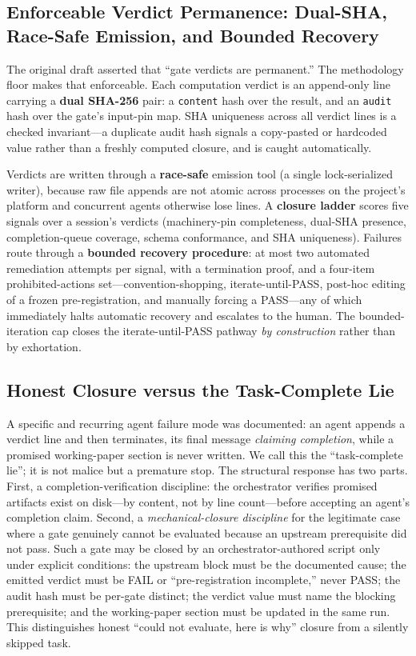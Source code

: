 \documentclass[12pt,a4paper]{article}
\begin{document}
\subsection{Enforceable Verdict Permanence: Dual-SHA, Race-Safe Emission, and Bounded Recovery}
\label{sec:floor-verdict}

The original draft asserted that ``gate verdicts are permanent.'' The methodology floor makes that enforceable. Each computation verdict is an append-only line carrying a \textbf{dual SHA-256} pair: a \texttt{content} hash over the result, and an \texttt{audit} hash over the gate's input-pin map. SHA uniqueness across all verdict lines is a checked invariant---a duplicate audit hash signals a copy-pasted or hardcoded value rather than a freshly computed closure, and is caught automatically.

Verdicts are written through a \textbf{race-safe} emission tool (a single lock-serialized writer), because raw file appends are not atomic across processes on the project's platform and concurrent agents otherwise lose lines. A \textbf{closure ladder} scores five signals over a session's verdicts (machinery-pin completeness, dual-SHA presence, completion-queue coverage, schema conformance, and SHA uniqueness). Failures route through a \textbf{bounded recovery procedure}: at most two automated remediation attempts per signal, with a termination proof, and a four-item prohibited-actions set---convention-shopping, iterate-until-PASS, post-hoc editing of a frozen pre-registration, and manually forcing a PASS---any of which immediately halts automatic recovery and escalates to the human. The bounded-iteration cap closes the iterate-until-PASS pathway \emph{by construction} rather than by exhortation.

\subsection{Honest Closure versus the Task-Complete Lie}
\label{sec:floor-closure}

A specific and recurring agent failure mode was documented: an agent appends a verdict line and then terminates, its final message \emph{claiming completion}, while a promised working-paper section is never written. We call this the ``task-complete lie''; it is not malice but a premature stop. The structural response has two parts. First, a completion-verification discipline: the orchestrator verifies promised artifacts exist on disk---by content, not by line count---before accepting an agent's completion claim. Second, a \emph{mechanical-closure discipline} for the legitimate case where a gate genuinely cannot be evaluated because an upstream prerequisite did not pass. Such a gate may be closed by an orchestrator-authored script only under explicit conditions: the upstream block must be the documented cause; the emitted verdict must be FAIL or ``pre-registration incomplete,'' never PASS; the audit hash must be per-gate distinct; the verdict value must name the blocking prerequisite; and the working-paper section must be updated in the same run. This distinguishes honest ``could not evaluate, here is why'' closure from a silently skipped task.
\end{document}
